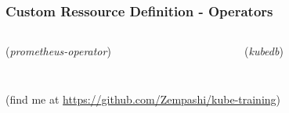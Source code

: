 \documentclass{beamer}
\begin{document}
\begin{frame}
  \frametitle{Custom Ressource Definition - Operators}
  \begin{columns}
  \begin{column}{0.55\textwidth}
    (\textit{prometheus-operator})
    \inputminted[fontsize=\tiny,frame=single]{yaml}{resources/service-monitor.yaml}
  \end{column}
  \begin{column}{0.4\textwidth}
    (\textit{kubedb})
    \inputminted[fontsize=\tiny,frame=single]{yaml}{resources/kubedb.yaml}
  \end{column}
  \end{columns}
\end{frame}

\begin{frame}
\vfill
{}
\vfill
(find me at \href{https://github.com/Zempashi/kube-training}{https://github.com/Zempashi/kube-training})
\end{frame}
\end{document}
